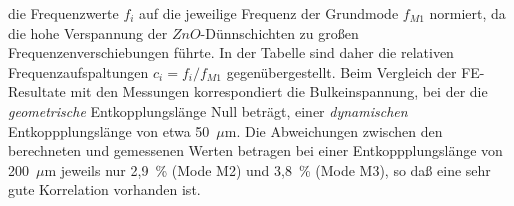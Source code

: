 die Frequenzwerte $f_{i}$ auf die jeweilige Frequenz der
Grundmode $f_{M1}$ normiert, da die hohe Verspannung der
$ZnO$-Dünnschichten zu großen Frequenzenverschiebungen führte.
In der Tabelle sind daher die relativen Frequenzaufspaltungen
$c_{i} = f_{i}/f_{M1}$ gegenübergestellt. Beim
Vergleich der FE-Resultate mit den Messungen korrespondiert die
Bulkeinspannung, bei der die {\em geometrische} Entkopplungslänge Null
beträgt, einer {\em dynamischen} Entkoppplungslänge von etwa 50~$\mu$m.
Die Abweichungen zwischen den
berechneten und gemessenen Werten betragen bei einer Entkoppplungslänge
von 200~$\mu$m jeweils nur 2,9~\% (Mode M2) und 3,8~\% (Mode M3), so daß
eine sehr gute Korrelation vorhanden ist.\\
